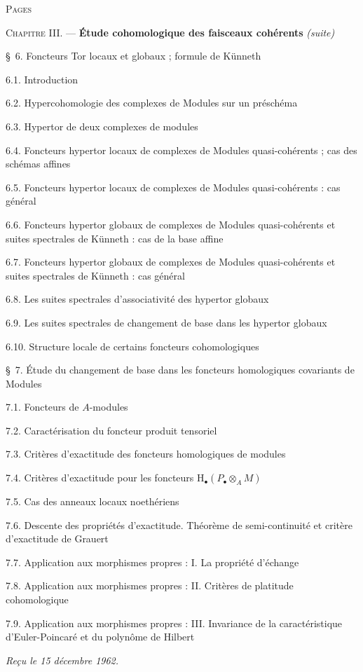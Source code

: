\begin{flushleft}
\hfill\textsc{Pages}

\textsc{Chapitre III.} --- \textbf{Étude cohomologique des faisceaux cohérents}
\textit{(suite)} 

\medskip
\S~6. Foncteurs Tor locaux et globaux ; formule de Künneth 

6.1. Introduction 

6.2. Hypercohomologie des complexes de Modules sur un préschéma 

6.3. Hypertor de deux complexes de modules 

6.4. Foncteurs hypertor locaux de complexes de Modules quasi-cohérents ; cas
des schémas affines 

6.5. Foncteurs hypertor locaux de complexes de Modules quasi-cohérents : cas
général 

6.6. Foncteurs hypertor globaux de complexes de Modules quasi-cohérents et
suites spectrales de Künneth : cas de la base affine 

6.7. Foncteurs hypertor globaux de complexes de Modules quasi-cohérents et
suites spectrales de Künneth : cas général 

6.8. Les suites spectrales d'associativité des hypertor globaux 

6.9. Les suites spectrales de changement de base dans les hypertor globaux

6.10. Structure locale de certains foncteurs cohomologiques 

\medskip
\S~7. Étude du changement de base dans les foncteurs homologiques covariants
de Modules 

7.1. Foncteurs de $A$-modules 

7.2. Caractérisation du foncteur produit tensoriel 

7.3. Critères d'exactitude des foncteurs homologiques de modules 

7.4. Critères d'exactitude pour les foncteurs
$\mathrm H_\bullet(P_\bullet\otimes_A M)$ 

7.5. Cas des anneaux locaux noethériens 

7.6. Descente des propriétés d'exactitude. Théorème de semi-continuité et
critère d'exactitude de Grauert 

7.7. Application aux morphismes propres : I. La propriété d'échange

7.8. Application aux morphismes propres : II. Critères de platitude
cohomologique 

7.9. Application aux morphismes propres : III. Invariance de la
caractéristique d'Euler-Poincaré et du polynôme de Hilbert 

\begin{flushright}
\emph{Reçu le 15 décembre 1962.}
\end{flushright}
\end{flushleft}


